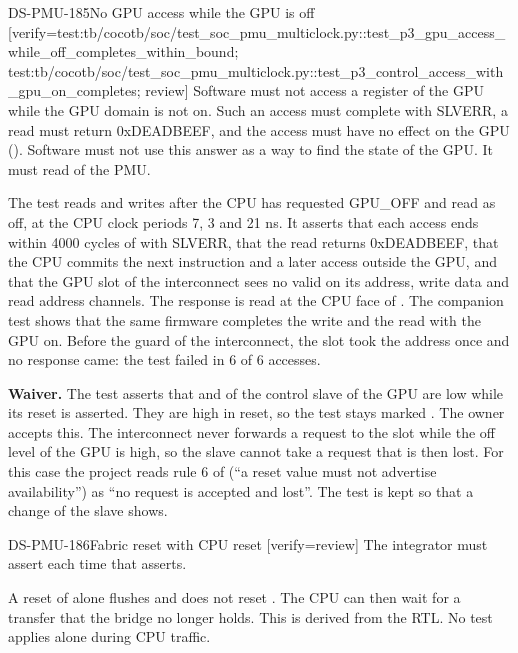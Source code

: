 \begin{requirement}{DS-PMU-185}{No GPU access while the GPU is off}
[verify={test:tb/cocotb/soc/test_soc_pmu_multiclock.py::test_p3_gpu_access_while_off_completes_within_bound; test:tb/cocotb/soc/test_soc_pmu_multiclock.py::test_p3_control_access_with_gpu_on_completes; review}]
Software must not access a register of the GPU while the GPU domain is not on. Such an access must complete with SLVERR, a read must return 0xDEADBEEF, and the access must have no effect on the GPU (). Software must not use this answer as a way to find the state of the GPU. It must read  of the PMU.
\end{requirement}
\begin{information}
The test  reads and writes  after the CPU has requested GPU\_OFF and read  as off, at the CPU clock periods 7, 3 and 21 ns. It asserts that each access ends within 4000 cycles of  with SLVERR, that the read returns 0xDEADBEEF, that the CPU commits the next instruction and a later access outside the GPU, and that the GPU slot of the interconnect sees no valid on its address, write data and read address channels. The response is read at the CPU face of . The companion test  shows that the same firmware completes the write and the read with the GPU on. Before the guard of the interconnect, the slot took the address once and no response came: the test failed in 6 of 6 accesses.

\textbf{Waiver.} The test  asserts that  and  of the control slave of the GPU are low while its reset is asserted. They are high in reset, so the test stays marked . The owner accepts this. The interconnect never forwards a request to the slot while the off level of the GPU is high, so the slave cannot take a request that is then lost. For this case the project reads rule 6 of  (``a reset value must not advertise availability'') as ``no request is accepted and lost''. The test is kept so that a change of the slave shows.
\end{information}

\begin{requirement}{DS-PMU-186}{Fabric reset with CPU reset}
[verify={review}]
The integrator must assert  each time that  asserts.
\end{requirement}
\begin{information}
A reset of  alone flushes  and does not reset . The CPU can then wait for a transfer that the bridge no longer holds. This is derived from the RTL. No test applies  alone during CPU traffic.
\end{information}

